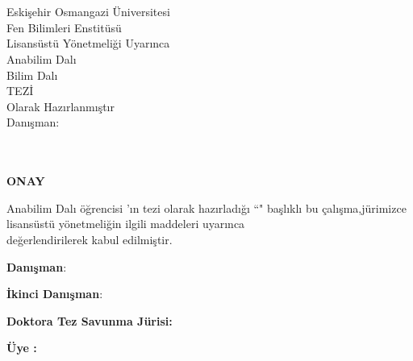 \documentclass[]{esogu}			%
\begin{document}
\begin{titlingpage*}
\begin{center}
\vspace*{10mm}
\tbaslik\\								%
\vspace{12pc}							%
\yazar	\\								%
\vspace{8pc}							%
Eskişehir Osmangazi Üniversitesi\\		
Fen Bilimleri Enstitüsü\\
Lisansüstü Yönetmeliği Uyarınca\\
\bolum \space Anabilim Dalı\\
\bilim \space Bilim Dalı\\
\unvan \space TEZİ\\
Olarak Hazırlanmıştır\\
\vspace{7pc}
Danışman:\space \danisman\\			
\vfill	
\proje\\ 								%
\vspace{1pc}
\teslim\\
\vspace{2cm}
\end{center}

\end{titlingpage*}
\normalsize

\thispagestyle{empty}
\begin{center}
\large
\textbf{ONAY} 
\normalsize
\end{center}

\bolum \space Anabilim Dalı \unvan \space öğrencisi \yazar'ın \space \unvan\space tezi olarak hazırladığı ``\textbf{\tbaslik}" başlıklı bu çalışma,\space jürimizce lisansüstü yönetmeliğin ilgili maddeleri uyarınca \\değerlendirilerek kabul edilmiştir.
\vspace{15mm}

\noindent \textbf{Danışman}\space\space\space\space\space\space\space\space:\space \danisman 

\noindent \textbf{İkinci Danışman}\space:\space \ikidanisman
\newline

\noindent \textbf{Doktora Tez Savunma Jürisi:}

\noindent \textbf{Üye :\space}\jbir
\end{document}
